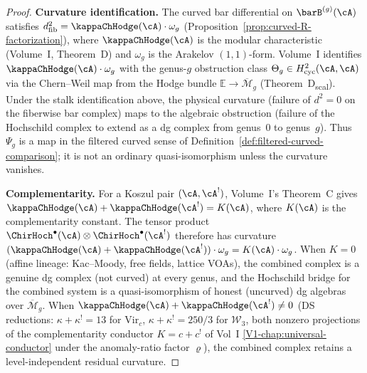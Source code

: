 \begin{proof}
\textbf{Curvature identification.}
The curved bar differential on $\barB^{(g)}(\cA)$ satisfies
$d_{\mathrm{fib}}^2 = \kappaChHodge(\cA) \cdot \omega_g$
(Proposition~\ref{prop:curved-R-factorization}), where
$\kappaChHodge(\cA)$ is the modular characteristic (Volume~I,
Theorem~D) and $\omega_g$ is the Arakelov $(1,1)$-form.
Volume~I identifies $\kappaChHodge(\cA) \cdot \omega_g$ with the
genus-$g$ obstruction class
\(\Theta_g\in H^2_{\mathrm{cyc}}(\cA,\cA)\) via the Chern--Weil map
from the Hodge bundle $\mathbb{E} \to \overline{\mathcal{M}}_g$
(Theorem~D\textsubscript{scal}).
Under the stalk identification above, the physical curvature
(failure of $d^2 = 0$ on the fiberwise bar complex) maps to the
algebraic obstruction (failure of the Hochschild complex to
extend as a dg complex from genus~$0$ to genus~$g$).
Thus \(\Psi_g\) is a map in the filtered curved sense of
Definition~\ref{def:filtered-curved-comparison}; it is not an
ordinary quasi-isomorphism unless the curvature vanishes.

\textbf{Complementarity.}
For a Koszul pair $(\cA, \cA^!)$, Volume~I's Theorem~C gives
$\kappaChHodge(\cA) + \kappaChHodge(\cA^!) = K(\cA)$, where $K(\cA)$ is
the complementarity constant. The tensor product
$\ChirHoch^\bullet(\cA) \otimes \ChirHoch^\bullet(\cA^!)$
therefore has curvature
$(\kappaChHodge(\cA) + \kappaChHodge(\cA^!)) \cdot \omega_g
= K(\cA) \cdot \omega_g$.
When $K = 0$ (affine lineage: Kac--Moody, free fields, lattice
VOAs), the combined complex is a genuine dg complex (not curved)
at every genus, and the Hochschild bridge for the combined system
is a quasi-isomorphism of honest (uncurved) dg algebras
over $\overline{\mathcal{M}}_g$. When $\kappaChHodge(\cA) + \kappaChHodge(\cA^{!}) \neq 0$ (DS reductions:
$\kappa + \kappa^{!} = 13$ for $\mathrm{Vir}_c$,
$\kappa + \kappa^{!} = 250/3$ for $\mathcal{W}_3$, both nonzero
 projections of the complementarity conductor $K = c + c^{!}$ of Vol~I
\cref{V1-chap:universal-conductor} under the anomaly-ratio factor
$\varrho$), the combined complex retains a level-independent
residual curvature.
\end{proof}


